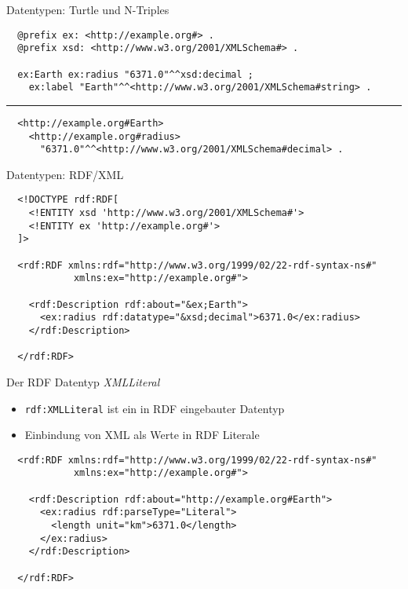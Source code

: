 \documentclass{beamer}
\begin{document}
\begin{frame}[fragile]{Datentypen: Turtle und N-Triples}
	
	\small
	\begin{lstlisting}
  @prefix ex: <http://example.org#> .
  @prefix xsd: <http://www.w3.org/2001/XMLSchema#> . 
		
  ex:Earth ex:radius "6371.0"^^xsd:decimal ;
    ex:label "Earth"^^<http://www.w3.org/2001/XMLSchema#string> .
		\end{lstlisting}
		
	\vspace{0.2cm}
	
	\centering\noindent\rule{8cm}{0.4pt}
	
	\vspace{0.2cm}
	
	\small
	\begin{lstlisting}
  <http://example.org#Earth> 
    <http://example.org#radius> 
      "6371.0"^^<http://www.w3.org/2001/XMLSchema#decimal> .
	\end{lstlisting}
	
\end{frame}

\begin{frame}[fragile]{Datentypen: RDF/XML}
	
	\small
	\begin{lstlisting}
  <!DOCTYPE rdf:RDF[
    <!ENTITY xsd 'http://www.w3.org/2001/XMLSchema#'>
    <!ENTITY ex 'http://example.org#'>
  ]>
    
  <rdf:RDF xmlns:rdf="http://www.w3.org/1999/02/22-rdf-syntax-ns#"
            xmlns:ex="http://example.org#">
	
    <rdf:Description rdf:about="&ex;Earth">
      <ex:radius rdf:datatype="&xsd;decimal">6371.0</ex:radius>
    </rdf:Description>
	
  </rdf:RDF>		
	\end{lstlisting}
	
\end{frame}

\begin{frame}[fragile]{Der RDF Datentyp \emph{XMLLiteral}}
	
	\begin{itemize}
		\item \texttt{rdf:XMLLiteral} ist ein in RDF eingebauter Datentyp
		\item Einbindung von XML als Werte in RDF Literale
	\end{itemize}
	
	\small
	\begin{lstlisting}		
  <rdf:RDF xmlns:rdf="http://www.w3.org/1999/02/22-rdf-syntax-ns#"
            xmlns:ex="http://example.org#">
		
    <rdf:Description rdf:about="http://example.org#Earth">
      <ex:radius rdf:parseType="Literal">
        <length unit="km">6371.0</length>
      </ex:radius>
    </rdf:Description>
		
  </rdf:RDF>		
	\end{lstlisting}
	
\end{frame}
\end{document}
